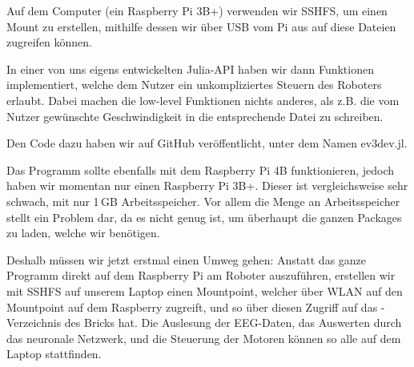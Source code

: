\documentclass[11pt]{scrartcl}
\begin{document}
	Auf dem Computer (ein Raspberry Pi 3B+) verwenden wir SSHFS, um einen Mount zu erstellen, mithilfe dessen wir über USB vom Pi aus auf diese Dateien zugreifen können.

	In einer von uns eigens entwickelten Julia-API haben wir dann Funktionen implementiert, welche dem Nutzer ein unkompliziertes Steuern des Roboters erlaubt. Dabei machen die low-level Funktionen nichts anderes, als z.B. die vom Nutzer gewünschte Geschwindigkeit in die entsprechende Datei zu schreiben.

	Den Code dazu haben wir auf GitHub veröffentlicht, unter dem Namen ev3dev.jl. \cite{ev3dev}

	Das Programm sollte ebenfalls mit dem Raspberry Pi 4B funktionieren, jedoch haben wir momentan nur einen Raspberry Pi 3B+. Dieser ist vergleichsweise sehr schwach, mit nur 1\,GB Arbeitsspeicher. Vor allem die Menge an Arbeitsspeicher stellt ein Problem dar, da es nicht genug ist, um überhaupt die ganzen Packages zu laden, welche wir benötigen.

	Deshalb müssen wir jetzt erstmal einen Umweg gehen: Anstatt das ganze Programm direkt auf dem Raspberry Pi am Roboter auszuführen, erstellen wir mit SSHFS auf unserem Laptop einen Mountpoint, welcher über WLAN auf den Mountpoint auf dem Raspberry zugreift, und so über diesen Zugriff auf das -Verzeichnis des Bricks hat. Die Auslesung der EEG-Daten, das Auswerten durch das neuronale Netzwerk, und die Steuerung der Motoren können so alle auf dem Laptop stattfinden.
	
\end{document}

